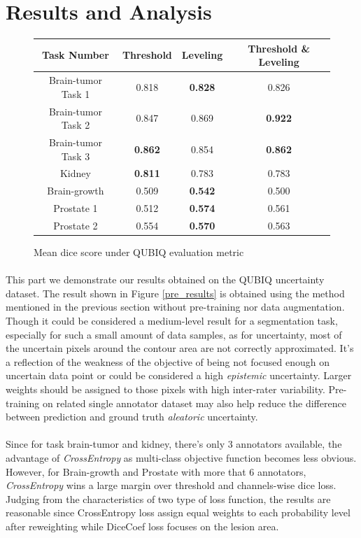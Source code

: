 \documentclass[12pt]{extarticle}
\begin{document}
\section{Results and Analysis}
\begin{figure}[ht!]
\begin{center}
    \begin{tabular}{|| c | c | c | c ||}
       \hline
       Task Number & Threshold & Leveling & Threshold \& Leveling \\
       \hline \hline
        Brain-tumor Task 1 & 0.818 & \textbf{0.828} & 0.826 \\
        Brain-tumor Task 2 & 0.847 & 0.869 & \textbf{0.922}\\
        Brain-tumor Task 3 & \textbf{0.862} & 0.854 & \textbf{0.862}\\
        Kidney & \textbf{0.811} & 0.783 & 0.783\\
        Brain-growth & 0.509 & \textbf{0.542} & 0.500  \\
        Prostate 1 & 0.512 & \textbf{0.574} & 0.561 \\
        Prostate 2 & 0.554 & \textbf{0.570} & 0.563\\
        \hline \hline
    \end{tabular}
\end{center}
\caption{Mean dice score under QUBIQ evaluation metric}
\end{figure}
\paragraph{}
This part we demonstrate our results obtained on the QUBIQ uncertainty dataset.
The result shown in Figure \ref{pre_results} is obtained using the method mentioned in the previous 
section without pre-training nor data augmentation.
Though it could be considered a medium-level result for a segmentation task, especially for such
a small amount of data samples, as for uncertainty, most of the uncertain pixels around the contour area are not 
correctly approximated. It's a reflection of the weakness of the objective of 
being not focused enough on uncertain data point or could be considered a high \textit{epistemic} uncertainty. 
Larger weights should be assigned to those pixels with high inter-rater variability. Pre-training on 
related single annotator dataset may also help reduce the difference between 
prediction and ground truth \textit{aleatoric} uncertainty.
\paragraph{}
Since for task brain-tumor and kidney, there's only 3 annotators available, the advantage of \textit{CrossEntropy} as 
multi-class objective function becomes less obvious. However, for Brain-growth and Prostate with more that 6 annotators, \textit{CrossEntropy}
wins a large margin over threshold and channels-wise dice loss. Judging from the characteristics of two type of 
loss function, the results are reasonable since CrossEntropy loss assign equal weights to each probability level after reweighting while 
DiceCoef loss focuses on the lesion area. 
\end{document}

